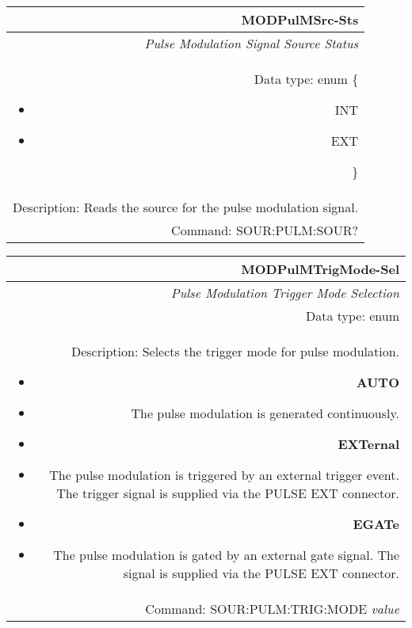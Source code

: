 \documentclass[openany]{article}
\begin{document}
		\begin{tabular}{N}
			\hline
			\bfseries MODPulMSrc-Sts \\ \hline
			\emph{Pulse Modulation Signal Source Status} \\
			Data type: enum \{\begin{itemize}[noitemsep]
				\small
				\item[] INT
				\item[] EXT
			\end{itemize}\} \\ 
			Description: Reads the source for the pulse modulation signal. \\
			Command: SOUR:PULM:SOUR? \\

		\end{tabular}
%
		\begin{tabular}{N}
			\hline
			\bfseries MODPulMTrigMode-Sel \\ \hline
			\emph{Pulse Modulation Trigger Mode Selection} \\
			Data type: enum \\  
			Description: Selects the trigger mode for pulse modulation. \begin{itemize}[noitemsep]
				\small
				\item[] \textbf{AUTO}
                                \item[] The pulse modulation is generated continuously.
                                \item[] \textbf{EXTernal}
                                \item[] The pulse modulation is triggered by an external trigger event. The trigger signal is supplied via the PULSE EXT connector.
				\item[] \textbf{EGATe}
				\item[] The pulse modulation is gated by an external gate signal. The signal is supplied via the PULSE EXT connector.
			\end{itemize} \\
			Command: SOUR:PULM:TRIG:MODE \emph{value} \\

		\end{tabular}
\end{document}
